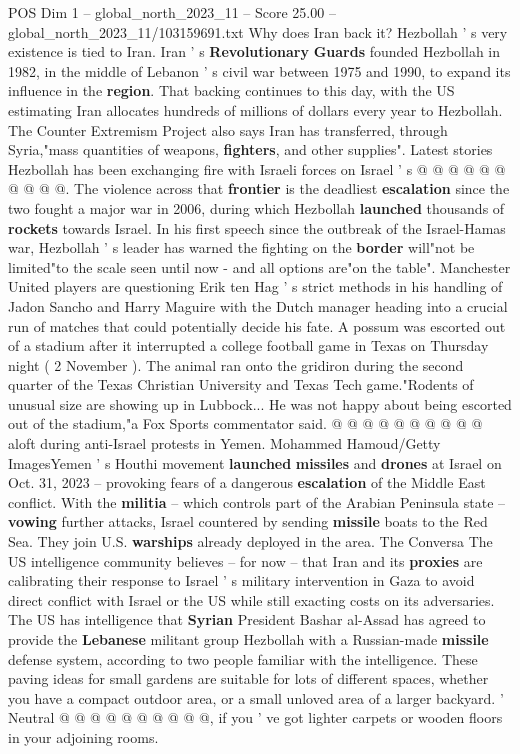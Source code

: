 \begin{textsample}{POS Dim 1 – global\_north\_2023\_11 – Score 25.00 – global\_north\_2023\_11/103159691.txt}
Why does Iran back it?
Hezbollah ' s very existence is tied to Iran.
Iran ' s \textbf{Revolutionary} \textbf{Guards} founded Hezbollah in 1982, in the middle of Lebanon ' s civil war between 1975 and 1990, to expand its influence in the \textbf{region}.
That backing continues to this day, with the US estimating Iran allocates hundreds of millions of dollars every year to Hezbollah.
The Counter Extremism Project also says Iran has transferred, through Syria,"mass quantities of weapons, \textbf{fighters}, and other supplies".
Latest stories Hezbollah has been exchanging fire with Israeli forces on Israel ' s @ @ @ @ @ @ @ @ @ @.
The violence across that \textbf{frontier} is the deadliest \textbf{escalation} since the two fought a major war in 2006, during which Hezbollah \textbf{launched} thousands of \textbf{rockets} towards Israel.
In his first speech since the outbreak of the Israel-Hamas war, Hezbollah ' s leader has warned the fighting on the \textbf{border} will"not be limited"to the scale seen until now - and all options are"on the table".
Manchester United players are questioning Erik ten Hag ' s strict methods in his handling of Jadon Sancho and Harry Maguire with the Dutch manager heading into a crucial run of matches that could potentially decide his fate.
A possum was escorted out of a stadium after it interrupted a college football game in Texas on Thursday night ( 2 November ).
The animal ran onto the gridiron during the second quarter of the Texas Christian University and Texas Tech game."Rodents of unusual size are showing up in Lubbock...
He was not happy about being escorted out of the stadium,"a Fox Sports commentator said. @ @ @ @ @ @ @ @ @ @ aloft during anti-Israel protests in Yemen.
Mohammed Hamoud/Getty ImagesYemen ' s Houthi movement \textbf{launched} \textbf{missiles} and \textbf{drones} at Israel on Oct. 31, 2023 -- provoking fears of a dangerous \textbf{escalation} of the Middle East conflict.
With the \textbf{militia} -- which controls part of the Arabian Peninsula state -- \textbf{vowing} further attacks, Israel countered by sending \textbf{missile} boats to the Red Sea.
They join U.S. \textbf{warships} already deployed in the area.
The Conversa The US intelligence community believes -- for now -- that Iran and its \textbf{proxies} are calibrating their response to Israel ' s military intervention in Gaza to avoid direct conflict with Israel or the US while still exacting costs on its adversaries.
The US has intelligence that \textbf{Syrian} President Bashar al-Assad has agreed to provide the \textbf{Lebanese} militant group Hezbollah with a Russian-made \textbf{missile} defense system, according to two people familiar with the intelligence.
These paving ideas for small gardens are suitable for lots of different spaces, whether you have a compact outdoor area, or a small unloved area of a larger backyard. ' Neutral @ @ @ @ @ @ @ @ @ @, if you ' ve got lighter carpets or wooden floors in your adjoining rooms.

\end{textsample}

